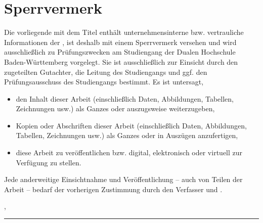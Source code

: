 \thispagestyle{empty}
\section*{Sperrvermerk}

\vspace*{2em}


Die vorliegende {\arbeit} mit dem Titel {\itshape{} \titel{}\/} enthält unternehmensinterne bzw. vertrauliche Informationen der {\firma}, ist deshalb mit einem Sperrvermerk versehen und wird ausschließlich zu Prüfungszwecken am Studiengang {\studiengang} der Dualen Hochschule Baden-Württemberg {\dhbw} vorgelegt. Sie ist ausschließlich zur Einsicht durch den zugeteilten Gutachter, die Leitung des Studiengangs und ggf. den Prüfungsausschuss des Studiengangs bestimmt.  Es ist untersagt,
\begin{itemize}
\item den Inhalt dieser Arbeit (einschließlich Daten, Abbildungen, Tabellen, Zeichnungen usw.) als Ganzes oder auszugsweise weiterzugeben,
\item Kopien oder Abschriften dieser Arbeit (einschließlich Daten, Abbildungen, Tabellen, Zeichnungen usw.) als Ganzes oder in Auszügen anzufertigen,
\item diese Arbeit zu veröffentlichen bzw. digital, elektronisch oder virtuell zur Verfügung zu stellen.
\end{itemize}
Jede anderweitige Einsichtnahme und Veröffentlichung -- auch von Teilen der Arbeit -- bedarf der vorherigen Zustimmung durch den Verfasser und {\firma}.

\vspace{3em}

\abgabeort, \datumAbgabe
\vspace{4em}

\rule{6cm}{0.4pt}\\
\autor
